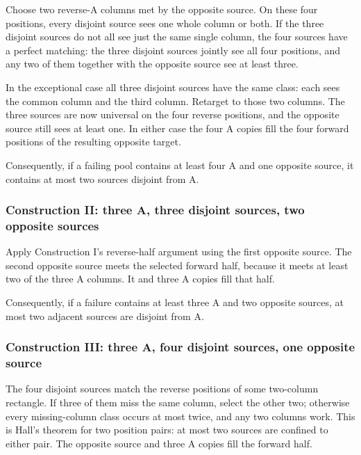 \documentclass[
  10pt,
]{article}
\begin{document}
Choose two reverse-A columns met by the opposite source. On these four
positions, every disjoint source sees one whole column or both. If the
three disjoint sources do not all see just the same single column, the
four sources have a perfect matching: the three disjoint sources jointly
see all four positions, and any two of them together with the opposite
source see at least three.

In the exceptional case all three disjoint sources have the same class:
each sees the common column and the third column. Retarget to those two
columns. The three sources are now universal on the four reverse
positions, and the opposite source still sees at least one. In either
case the four A copies fill the four forward positions of the resulting
opposite target.

Consequently, if a failing pool contains at least four A and one
opposite source, it contains at most two sources disjoint from A.

\hypertarget{construction-ii-three-a-three-disjoint-sources-two-opposite-sources}{%
\subsubsection*{Construction II: three A, three disjoint sources, two
opposite
sources}\label{construction-ii-three-a-three-disjoint-sources-two-opposite-sources}}

Apply Construction I's reverse-half argument using the first opposite
source. The second opposite source meets the selected forward half,
because it meets at least two of the three A columns. It and three A
copies fill that half.

Consequently, if a failure contains at least three A and two opposite
sources, at most two adjacent sources are disjoint from A.

\hypertarget{construction-iii-three-a-four-disjoint-sources-one-opposite-source}{%
\subsubsection*{Construction III: three A, four disjoint sources, one
opposite
source}\label{construction-iii-three-a-four-disjoint-sources-one-opposite-source}}

The four disjoint sources match the reverse positions of some two-column
rectangle. If three of them miss the same column, select the other two;
otherwise every missing-column class occurs at most twice, and any two
columns work. This is Hall's theorem for two position pairs: at most two
sources are confined to either pair. The opposite source and three A
copies fill the forward half.
\end{document}
